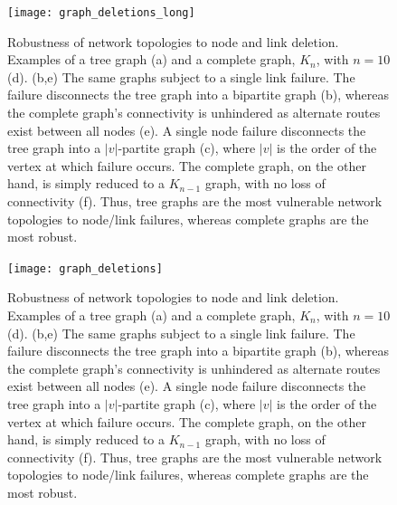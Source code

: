 \doublecol
	\begin{figure}[!htbp]
	\texttt{[image: graph\_deletions\_long]}
	\captionspacefig \caption{Robustness of network topologies to node and link deletion. Examples of a tree graph (a) and a complete graph, $K_n$, with \mbox{$n=10$} (d). (b,e) The same graphs subject to a single link failure. The failure disconnects the tree graph into a bipartite graph (b), whereas the complete graph's connectivity is unhindered as alternate routes exist between all nodes (e). A single node failure disconnects the tree graph into a $|v|$-partite graph (c), where $|v|$ is the order of the vertex at which failure occurs. The complete graph, on the other hand, is simply reduced to a $K_{n-1}$ graph, with no loss of connectivity (f). Thus, tree graphs are the most vulnerable network topologies to node/link failures, whereas complete graphs are the most robust.}\label{fig:graph_deletions}
	\end{figure}
\else
	\begin{figure}[!htbp]
	\texttt{[image: graph\_deletions]}
	\captionspacefig \caption{Robustness of network topologies to node and link deletion. Examples of a tree graph (a) and a complete graph, $K_n$, with \mbox{$n=10$} (d). (b,e) The same graphs subject to a single link failure. The failure disconnects the tree graph into a bipartite graph (b), whereas the complete graph's connectivity is unhindered as alternate routes exist between all nodes (e). A single node failure disconnects the tree graph into a $|v|$-partite graph (c), where $|v|$ is the order of the vertex at which failure occurs. The complete graph, on the other hand, is simply reduced to a $K_{n-1}$ graph, with no loss of connectivity (f). Thus, tree graphs are the most vulnerable network topologies to node/link failures, whereas complete graphs are the most robust.}\label{fig:graph_deletions}
	\end{figure}
\fi